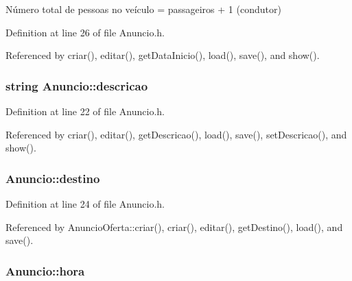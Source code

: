 Número total de pessoas no veículo = passageiros + 1 (condutor) 



Definition at line 26 of file Anuncio.\+h.



Referenced by criar(), editar(), get\+Data\+Inicio(), load(), save(), and show().

\hypertarget{class_anuncio_aa6a9eb8d08cb06d16061b006eb2c8b97}{
\subsubsection[{descricao}]{\setlength{\rightskip}{0pt plus 5cm}string Anuncio\+::descricao\hspace{0.3cm}{\ttfamily [protected]}}}\label{class_anuncio_aa6a9eb8d08cb06d16061b006eb2c8b97}


Definition at line 22 of file Anuncio.\+h.



Referenced by criar(), editar(), get\+Descricao(), load(), save(), set\+Descricao(), and show().

\hypertarget{class_anuncio_acdac86595f84cfb8a2bf54c414857168}{
\subsubsection[{destino}]{ Anuncio\+::destino\hspace{0.3cm}{\ttfamily [protected]}}}\label{class_anuncio_acdac86595f84cfb8a2bf54c414857168}


Definition at line 24 of file Anuncio.\+h.



Referenced by Anuncio\+Oferta\+::criar(), criar(), editar(), get\+Destino(), load(), and save().

\hypertarget{class_anuncio_aee851839cb45594b8ee550a032236cfe}{
\subsubsection[{hora}]{ Anuncio\+::hora\hspace{0.3cm}{\ttfamily [protected]}}}\label{class_anuncio_aee851839cb45594b8ee550a032236cfe}


